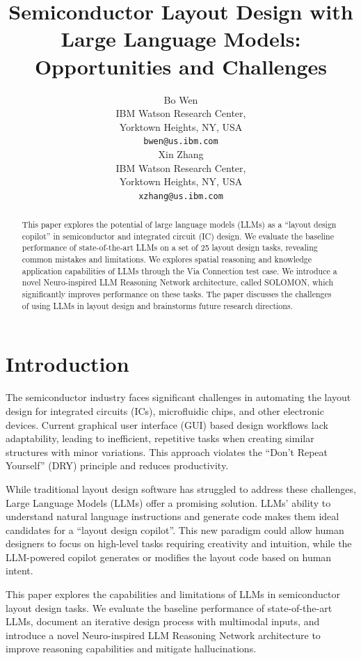 \documentclass{article}
\title{Semiconductor Layout Design with Large Language Models: Opportunities and Challenges}
\author{%
  Bo Wen\\
  IBM Watson Research Center, \\
  Yorktown Heights, NY, USA \\
  \texttt{bwen@us.ibm.com} \\
  \And
  Xin Zhang\\
  IBM Watson Research Center, \\
  Yorktown Heights, NY, USA \\
  \texttt{xzhang@us.ibm.com} \\
}
\begin{document}
\maketitle

\begin{abstract}
  This paper explores the potential of large language models (LLMs) as a ``layout design copilot'' in semiconductor and integrated circuit (IC) design. We evaluate the baseline performance of state-of-the-art LLMs on a set of 25 layout design tasks, revealing common mistakes and limitations. We explores spatial reasoning and knowledge application capabilities of LLMs through the Via Connection test case. We introduce a novel Neuro-inspired LLM Reasoning Network architecture, called SOLOMON, which significantly improves performance on these tasks. The paper discusses the challenges of using LLMs in layout design and brainstorms future research directions.
\end{abstract}

\section{Introduction}
The semiconductor industry faces significant challenges in automating the layout design for integrated circuits (ICs), microfluidic chips, and other electronic devices. Current graphical user interface (GUI) based design workflows lack adaptability, leading to inefficient, repetitive tasks when creating similar structures with minor variations.\cite{Greengard2024-hx} This approach violates the ``Don't Repeat Yourself'' (DRY) principle and reduces productivity.

While traditional layout design software has struggled to address these challenges, Large Language Models (LLMs) offer a promising solution. LLMs' ability to understand natural language instructions and generate code makes them ideal candidates for a ``layout design copilot''. This new paradigm could allow human designers to focus on high-level tasks requiring creativity and intuition, while the LLM-powered copilot generates or modifies the layout code based on human intent.

This paper explores the capabilities and limitations of LLMs in semiconductor layout design tasks. We evaluate the baseline performance of state-of-the-art LLMs, document an iterative design process with multimodal inputs, and introduce a novel Neuro-inspired LLM Reasoning Network architecture to improve reasoning capabilities and mitigate hallucinations.
\end{document}
